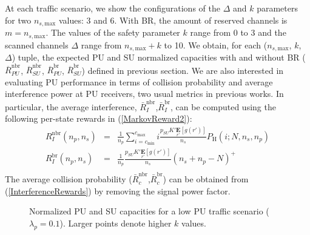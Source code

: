 At each traffic scenario, we show the configurations of the $\Delta$ and $k$ parameters for two $n_{s,\text{max}}$ values: 3 and 6. With BR, the amount of reserved channels is $m=n_{s,\text{max}}$. The values of the safety parameter $k$ range from 0 to 3 and the scanned channels $\Delta$ range from $n_{s,\text{max}}+k$ to 10.
We obtain, for each ($n_{s,\text{max}}$, $k$, $\Delta$) tuple, the expected PU and SU normalized capacities with and without BR ($\overline{R}^{\text{nbr}}_{PU}$, $\overline{R}^{\text{nbr}}_{SU}$, $\overline{R}^{\text{br}}_{PU}$, $\overline{R}^{\text{br}}_{SU}$) defined in previous section. 
We are also interested in evaluating PU performance in terms of collision probability and average interference power at PU receivers, two usual metrics in previous works.
In particular, the average interference, $\bar{R}^{\text{nbr}}_{I}$,$\bar{R}^{\text{br}}_{I}$, can be computed using the following per-state rewards in (\ref{MarkovReward2}):
\begin{equation}\label{InterferenceRewards}
\begin{array}{lcl}
R^{\text{nbr}}_{I}\left(n_{p},n_{s}\right)& = &\frac{1}{n_{p}}\displaystyle\sum_{i=c_{\text{min}}}^{c_{\text{max}}}i\textstyle\frac{p_{SU}K'\underset{r'}{\mathbf{E}}\left[g(r')\right]}{n_{s}}P_{\text{H}}\left(i;N,n_{s},n_{p}\right)\\
R^{\text{br}}_{I}\left(n_{p},n_{s}\right)& = &\frac{1}{n_{p}}\frac{p_{SU}K'\underset{r'}{\mathbf{E}}\left[g(r')\right]}{n_{s}}\left(n_{s}+n_{p}-N\right)^{+}\\
\end{array}
\end{equation}
The average collision probability ($\bar{R}^{\text{nbr}}_{c}$,$\bar{R}^{\text{br}}_{c}$) can be obtained from (\ref{InterferenceRewards}) by removing the signal power factor.
\begin{figure}
\begin{center}
\resizebox{9cm}{!}{}
\end{center}
\caption{Normalized PU and SU capacities for a low PU traffic scenario ($\lambda_{p}=0.1$). Larger points denote higher $k$ values.}\label{BR_fig_LowTraffic}
\end{figure}

